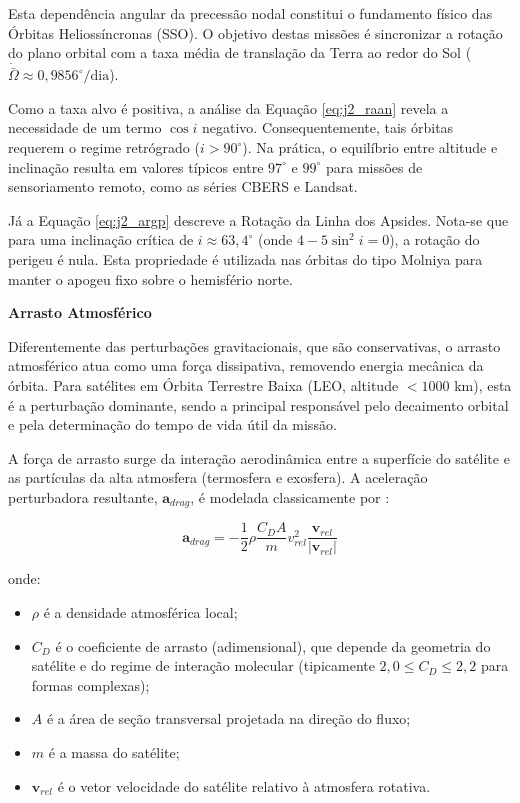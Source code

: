 Esta dependência angular da precessão nodal constitui o fundamento físico das Órbitas Heliossíncronas (SSO). O objetivo destas missões é sincronizar a rotação do plano orbital com a taxa média de translação da Terra ao redor do Sol ($\dot{\bar{\Omega}} \approx 0,9856^\circ/\text{dia}$).

Como a taxa alvo é positiva, a análise da Equação \ref{eq:j2_raan} revela a necessidade de um termo $\cos i$ negativo. Consequentemente, tais órbitas requerem o regime retrógrado ($i > 90^\circ$). Na prática, o equilíbrio entre altitude e inclinação resulta em valores típicos entre $97^\circ$ e $99^\circ$ para missões de sensoriamento remoto, como as séries CBERS e Landsat.

Já a Equação \ref{eq:j2_argp} descreve a Rotação da Linha dos Apsides. Nota-se que para uma inclinação crítica de $i \approx 63,4^\circ$ (onde $4 - 5 \sin^2 i = 0$), a rotação do perigeu é nula. Esta propriedade é utilizada nas órbitas do tipo Molniya para manter o apogeu fixo sobre o hemisfério norte.

\vspace{0.5cm}
\noindent \textbf{Arrasto Atmosférico}

Diferentemente das perturbações gravitacionais, que são conservativas, o arrasto atmosférico atua como uma força dissipativa, removendo energia mecânica da órbita. Para satélites em Órbita Terrestre Baixa (LEO, altitude $< 1000$ km), esta é a perturbação dominante, sendo a principal responsável pelo decaimento orbital e pela determinação do tempo de vida útil da missão.

A força de arrasto surge da interação aerodinâmica entre a superfície do satélite e as partículas da alta atmosfera (termosfera e exosfera). A aceleração perturbadora resultante, $\mathbf{a}_{drag}$, é modelada classicamente por \cite{Montenbruck2000}:

\begin{equation}
    \mathbf{a}_{drag} = - \frac{1}{2} \rho \frac{C_D A}{m} v_{rel}^2 \frac{\mathbf{v}_{rel}}{|\mathbf{v}_{rel}|}
    \label{eq:drag_force}
\end{equation}

\noindent onde:
\begin{itemize}
    \item $\rho$ é a densidade atmosférica local;
    \item $C_D$ é o coeficiente de arrasto (adimensional), que depende da geometria do satélite e do regime de interação molecular (tipicamente $2,0 \leq C_D \leq 2,2$ para formas complexas);
    \item $A$ é a área de seção transversal projetada na direção do fluxo;
    \item $m$ é a massa do satélite;
    \item $\mathbf{v}_{rel}$ é o vetor velocidade do satélite relativo à atmosfera rotativa.
\end{itemize}

